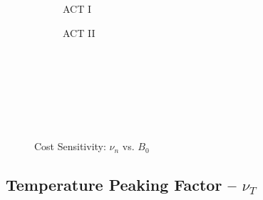 \begin{figure*}[h!]
\begin{subfigure}[t]{0.45\textwidth}
\begin{adjustbox}{width=\textwidth}
      \Large
      
    \end{adjustbox}
        \caption{ACT I}
    \end{subfigure}
    \hfill
    \begin{subfigure}[t]{0.45\textwidth}
        \centering
    \begin{adjustbox}{width=\textwidth}
      \Large
      
    \end{adjustbox}
        \caption{ACT II}
    \end{subfigure}
    \hfill \hfill ~\\ ~\\ ~\\ ~\\
  \caption[]{Cost Sensitivity: $\nu_n$ vs. $B_0$} ~\\
\end{figure*}


\clearpage

\newpage

\subsection*{ Temperature Peaking Factor -- $\nu_T$ }
  \label{subsection:sensitivity_nu_T}

